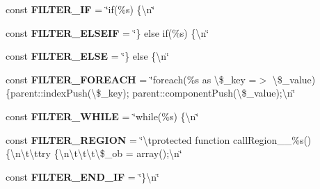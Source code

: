 \begin{DoxyCompactItemize}
\item 
\hypertarget{class_i_p_c_o___parser_settings_a54544c2d8329ba6e40439670cb19bb63}{const {\bfseries F\-I\-L\-T\-E\-R\-\_\-\-I\-F} = \char`\"{}if(\%s) \{\textbackslash{}n\char`\"{}}\label{class_i_p_c_o___parser_settings_a54544c2d8329ba6e40439670cb19bb63}

\item 
\hypertarget{class_i_p_c_o___parser_settings_aa0bc5613233b7ffbf6778e6622ca044c}{const {\bfseries F\-I\-L\-T\-E\-R\-\_\-\-E\-L\-S\-E\-I\-F} = \char`\"{}\} else if(\%s) \{\textbackslash{}n\char`\"{}}\label{class_i_p_c_o___parser_settings_aa0bc5613233b7ffbf6778e6622ca044c}

\item 
\hypertarget{class_i_p_c_o___parser_settings_a5e0b534f3fb0668cf615099f9cc4259b}{const {\bfseries F\-I\-L\-T\-E\-R\-\_\-\-E\-L\-S\-E} = \char`\"{}\} else \{\textbackslash{}n\char`\"{}}\label{class_i_p_c_o___parser_settings_a5e0b534f3fb0668cf615099f9cc4259b}

\item 
\hypertarget{class_i_p_c_o___parser_settings_ad0341cbaa56adc95bf2e800447d23856}{const {\bfseries F\-I\-L\-T\-E\-R\-\_\-\-F\-O\-R\-E\-A\-C\-H} = \char`\"{}foreach(\%s as \textbackslash{}\$\-\_\-key =$>$ \textbackslash{}\$\-\_\-value) \{parent\-::index\-Push(\textbackslash{}\$\-\_\-key); parent\-::component\-Push(\textbackslash{}\$\-\_\-value);\textbackslash{}n\char`\"{}}\label{class_i_p_c_o___parser_settings_ad0341cbaa56adc95bf2e800447d23856}

\item 
\hypertarget{class_i_p_c_o___parser_settings_a7cfbf78eb6677c8254fbd663532eb970}{const {\bfseries F\-I\-L\-T\-E\-R\-\_\-\-W\-H\-I\-L\-E} = \char`\"{}while(\%s) \{\textbackslash{}n\char`\"{}}\label{class_i_p_c_o___parser_settings_a7cfbf78eb6677c8254fbd663532eb970}

\item 
\hypertarget{class_i_p_c_o___parser_settings_a31df3bf29a25c77bcf9dba7494245029}{const {\bfseries F\-I\-L\-T\-E\-R\-\_\-\-R\-E\-G\-I\-O\-N} = \char`\"{}\textbackslash{}tprotected function call\-Region\-\_\-\-\_\-\%s() \{\textbackslash{}n\textbackslash{}t\textbackslash{}ttry \{\textbackslash{}n\textbackslash{}t\textbackslash{}t\textbackslash{}t\textbackslash{}\$\-\_\-ob = array();\textbackslash{}n\char`\"{}}\label{class_i_p_c_o___parser_settings_a31df3bf29a25c77bcf9dba7494245029}

\item 
\hypertarget{class_i_p_c_o___parser_settings_ab6940a79e1f0b4b096044b514365d932}{const {\bfseries F\-I\-L\-T\-E\-R\-\_\-\-E\-N\-D\-\_\-\-I\-F} = \char`\"{}\}\textbackslash{}n\char`\"{}}\label{class_i_p_c_o___parser_settings_ab6940a79e1f0b4b096044b514365d932}


\end{DoxyCompactItemize}
